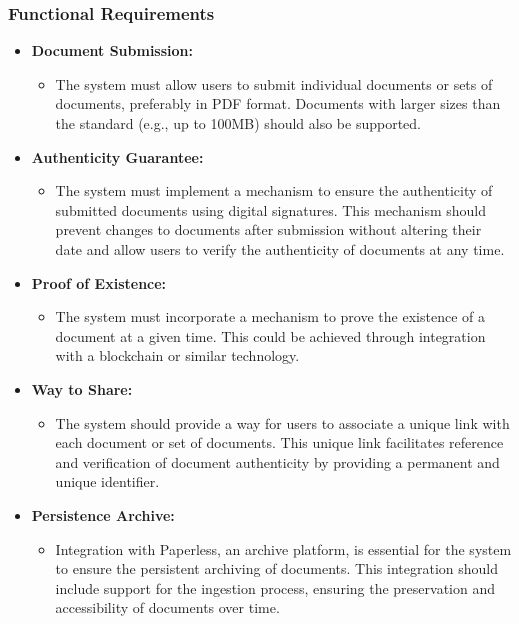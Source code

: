 \documentclass[a4paper,11pt]{article}
\begin{document}
    \subsubsection{Functional Requirements}
        \begin{itemize}
            \item \textbf{Document Submission:} 
            \begin{itemize}
                \item The system must allow users to submit individual documents or sets of documents, preferably in PDF format. Documents with larger sizes than the standard (e.g., up to 100MB) should also be supported.
            \end{itemize}
            
            \item \textbf{Authenticity Guarantee:} 
            \begin{itemize}
                \item The system must implement a mechanism to ensure the authenticity of submitted documents using digital signatures. This mechanism should prevent changes to documents after submission without altering their date and allow users to verify the authenticity of documents at any time.
            \end{itemize}
            
            \item \textbf{Proof of Existence:} 
            \begin{itemize}
                \item The system must incorporate a mechanism to prove the existence of a document at a given time. This could be achieved through integration with a blockchain or similar technology.
            \end{itemize}
            
            \item \textbf{Way to Share:} 
            \begin{itemize}
                \item The system should provide a way for users to associate a unique link with each document or set of documents. This unique link facilitates reference and verification of document authenticity by providing a permanent and unique identifier.
            \end{itemize}
            
            \item \textbf{Persistence Archive:} 
            \begin{itemize}
                \item Integration with Paperless, an archive platform, is essential for the system to ensure the persistent archiving of documents. This integration should include support for the ingestion process, ensuring the preservation and accessibility of documents over time.
            \end{itemize}
            

\end{itemize}
\end{document}
